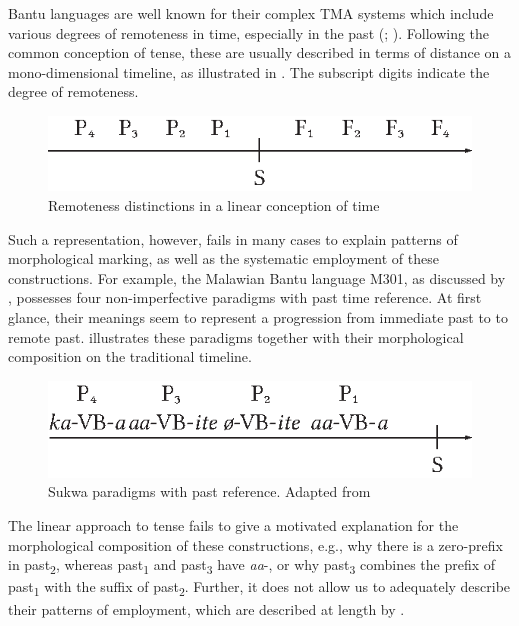 Bantu languages are well known for their complex TMA systems which include various degrees of remoteness in time, especially in the past (\citealt[185]{DahlOe1985}; \citealt[21f]{NurseD2008}). Following the common conception of tense, these are usually described in terms of distance on a mono-dimensional timeline, as illustrated in . The subscript digits indicate the degree of remoteness.

\begin{figure}[h]
\begin{center}
\includegraphics{figures/GrafikRemoteness.eps}
\caption{Remoteness distinctions in a linear conception of time}
\label{FigureRemoteness}
\end{center}
\end{figure}

Such a representation, however, fails in many cases to explain patterns of morphological marking, as well as the systematic employment of these constructions. For example, the Malawian Bantu language  M301, as discussed by \citet[93f]{KershnerT2002}, possesses four non-imperfective paradigms with past time reference. At first glance, their meanings seem to represent a progression from immediate past to to remote past.  illustrates these paradigms together with their morphological composition on the traditional timeline.

\begin{figure}[hbt]
\begin{center}
\includegraphics{figures/GrafikPastsSukwa.eps}
\caption{Sukwa paradigms with past reference. Adapted from \citet[94]{KershnerT2002}}
\label{FigureSukwaPasts}
\end{center}
\end{figure}

The linear approach to tense fails to give a motivated explanation for the morphological composition of these constructions, e.g., why there is a zero-prefix in past\textsubscript{2}, whereas past\textsubscript{1} and past\textsubscript{3} have \textit{aa}-, or why past\textsubscript{3} combines the prefix of past\textsubscript{1} with the suffix of past\textsubscript{2}. Further, it does not allow us to adequately describe their patterns of employment, which are described at length by \citet{KershnerT2002}.

